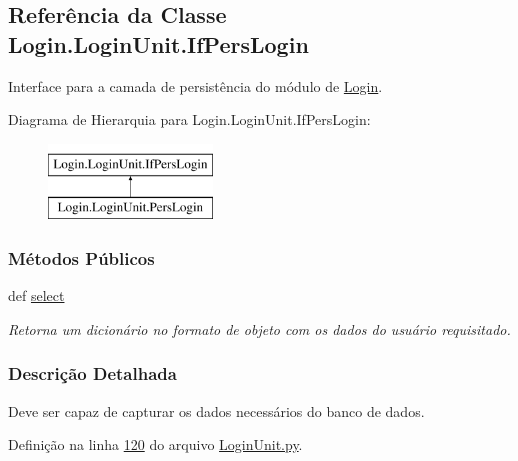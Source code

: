 \hypertarget{classLogin_1_1LoginUnit_1_1IfPersLogin}{\subsection{Referência da Classe Login.\-Login\-Unit.\-If\-Pers\-Login}
\label{classLogin_1_1LoginUnit_1_1IfPersLogin}
}


Interface para a camada de persistência do módulo de \hyperlink{namespaceLogin}{Login}.  


Diagrama de Hierarquia para Login.\-Login\-Unit.\-If\-Pers\-Login\-:\begin{figure}[H]
\begin{center}
\leavevmode
\includegraphics[height=2.000000cm]{da/dc3/classLogin_1_1LoginUnit_1_1IfPersLogin}
\end{center}
\end{figure}
\subsubsection*{Métodos Públicos}
\begin{DoxyCompactItemize}
\item 
def \hyperlink{classLogin_1_1LoginUnit_1_1IfPersLogin_a24648e1c42d0762277b5b7aa641fa575}{select}
\begin{DoxyCompactList}\small\item\em Retorna um dicionário no formato de objeto com os dados do usuário requisitado. \end{DoxyCompactList}\end{DoxyCompactItemize}


\subsubsection{Descrição Detalhada}
Deve ser capaz de capturar os dados necessários do banco de dados. 

Definição na linha \hyperlink{LoginUnit_8py_source_l00120}{120} do arquivo \hyperlink{LoginUnit_8py_source}{Login\-Unit.\-py}.




